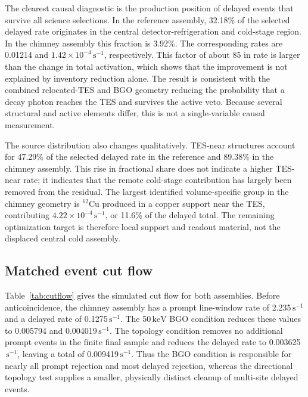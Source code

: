 \documentclass[11pt]{article}
\newcommand{\keV}{\ensuremath{\,\mathrm{keV}}\xspace}
\newcommand{\cps}{\ensuremath{\,\mathrm{s^{-1}}}\xspace}
\begin{document}
The clearest causal diagnostic is the production position of delayed events
that survive all science selections. In the reference assembly, 32.18\% of the
selected delayed rate originates in the central detector-refrigeration and
cold-stage region. In the chimney assembly this fraction is 3.92\%. The
corresponding rates are 0.01214 and $1.42\times10^{-4}\cps$, respectively. This
factor of about 85 in rate is larger than the change in total activation, which
shows that the improvement is not explained by inventory reduction alone.
The result is consistent with the combined relocated-TES and BGO geometry
reducing the probability that a decay photon reaches the TES and survives the
active veto. Because several structural and active elements differ, this is not
a single-variable causal measurement.

The source distribution also changes qualitatively. TES-near structures account
for 47.29\% of the selected delayed rate in the reference and 89.38\% in the
chimney assembly. This rise in fractional share does not indicate a higher
TES-near rate; it indicates that the remote cold-stage contribution has largely
been removed from the residual. The largest identified volume-specific group
in the chimney geometry is $^{62}$Cu produced in a copper support near the TES,
contributing $4.22\times10^{-4}\cps$, or 11.6\% of the delayed total. The
remaining optimization target is therefore local support and readout material,
not the displaced central cold assembly.

\subsection{Matched event cut flow}
\label{sec:cutflow}

Table~\ref{tab:cutflow} gives the simulated cut flow for both assemblies. Before
anticoincidence, the chimney assembly has a prompt line-window rate of
2.235\cps and a delayed rate of 0.1275\cps. The 50\keV BGO condition reduces
these values to 0.005794 and 0.004019\cps. The topology condition removes no
additional prompt events in the finite final sample and reduces the delayed
rate to 0.003625\cps, leaving a total of 0.009419\cps. Thus the BGO condition is
responsible for nearly all prompt rejection and most delayed rejection, whereas
the directional topology test supplies a smaller, physically distinct cleanup
of multi-site delayed events.
\end{document}
